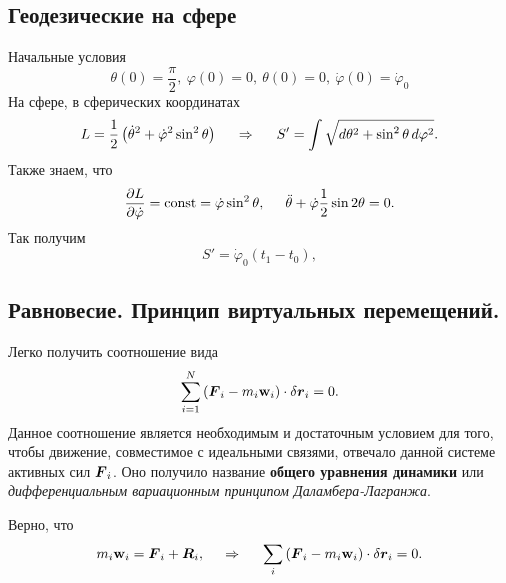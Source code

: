 \subsection{Геодезические на сфере}

Начальные условия
\begin{equation*}
    \theta(0) = \frac{\pi}{2},  \ \varphi(0) = 0, \ \theta(0) = 0, \ \dot{\varphi}(0) = \dot{\varphi}_0
\end{equation*}
На сфере, в сферических координатах
\begin{equation*}
    L = \frac{1}{2} \left(
        \dot{\theta}^2 + \dot{\varphi}^2 \sin^2 \theta
    \right)
    \hspace{0.5cm} \Rightarrow \hspace{0.5cm} 
    S' = \int \sqrt{d \theta^2 + \sin^2 \theta \, d \varphi^2}.
\end{equation*}
Также знаем, что
\begin{equation*}
    \frac{\partial L}{\partial \dot{\varphi}} = \text{const} = \dot{\varphi} \sin^2 \theta,
    \hspace{0.5cm} 
    \ddot{\theta} + \dot{\varphi} \frac{1}{2} \sin 2 \theta  = 0.
\end{equation*}
Так получим
\begin{equation*}
    S' = \dot{\varphi}_0 (t_1 - t_0), 
\end{equation*}


\subsection{Равновесие. Принцип виртуальных перемещений.}

Легко получить соотношение вида
\begin{equation}
    \sum_{i=1}^N \left(
        \mbox{\boldmath $F$}_i - m_i \mbox{\boldmath $\mathrm{w}$}_i
    \right) \cdot \delta \mbox{\boldmath $r$}_i = 0.
\end{equation}
Данное соотношение является необходимым и достаточным условием для того, чтобы движение, совместимое с идеальными связями, отвечало данной системе активных сил $\mbox{\boldmath $F$}_i$. Оно получило название \textbf{общего уравнения динамики} или \textit{дифференциальным вариационным принципом Даламбера-Лагранжа}.

\begin{to_thr} 
Верно, что
\begin{equation*}
    m_i \mbox{\boldmath $\mathrm{w}$}_i = \mbox{\boldmath $F$}_i + \mbox{\boldmath $R$}_i,
    \hspace{0.5cm} \Rightarrow \hspace{0.5cm} 
    \sum_i \left(
       \mbox{\boldmath $F$}_i -  m_i \mbox{\boldmath $\mathrm{w}$}_i
    \right) \cdot \delta \mbox{\boldmath $r$}_i = 0.
\end{equation*}
\end{to_thr}

